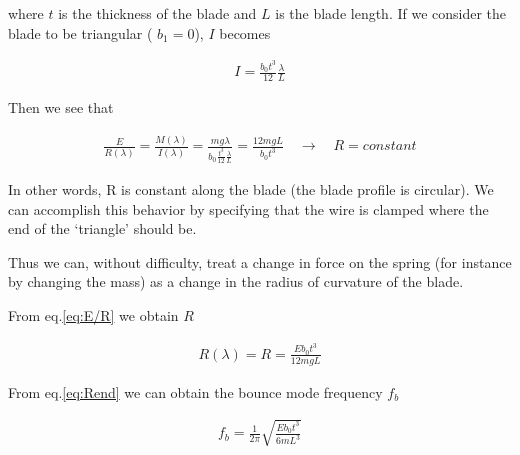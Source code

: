where $t$ is the thickness of the blade and $L$ is the blade length.  If we consider the blade to be triangular ( $b_1=0$), $I$ becomes

\begin{eqnarray}
I = \frac{b_0t^3}{12} \frac{\lambda}{L}
\label{eq:Itri}
\end{eqnarray}

Then we see that 

\begin{eqnarray}
\frac{E}{R(\lambda)} = \frac{M(\lambda)}{I(\lambda)} = 
\frac{m g \lambda}{b_0\frac{t^3}{12} \frac{\lambda}{L}} = 
\frac{12 m g L}{b_0 t^3} \quad \rightarrow \quad R=constant
\label{eq:E/R}
\end{eqnarray}

In other words, R is constant along the blade (the blade profile is circular). We can accomplish this behavior by specifying that the wire is clamped where the end of the `triangle' should be.



Thus we can, without difficulty, treat a change in force on the spring (for instance by changing the mass) as a change in the radius of curvature of the blade.


From eq.\ref{eq:E/R} we obtain $R$

\begin{eqnarray}
R(\lambda) = R = \frac{E b_0 t^3}{12 m g L}
\label{eq:Rend}
\end{eqnarray}

From eq.{\ref{eq:Rend}} we can obtain the bounce mode frequency $f_b$

\begin{eqnarray}
f_b = \frac{1}{2\pi}\sqrt{\frac{E b_0 t^3}{6 m L^3}}
\label{eq:fb}
\end{eqnarray}

